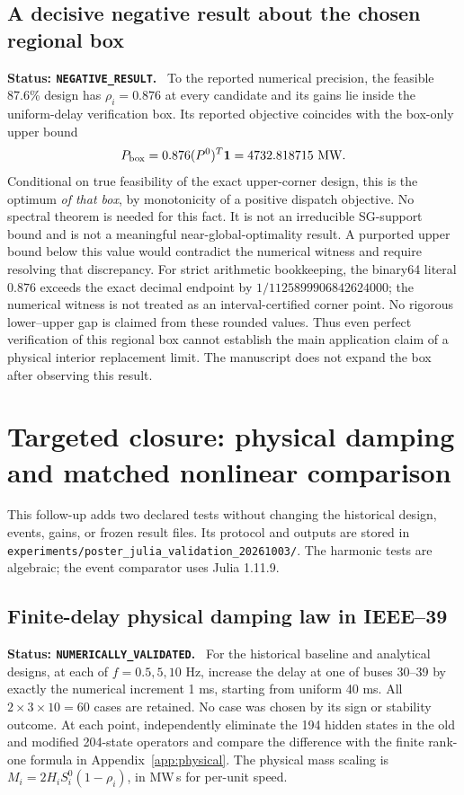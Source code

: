 \documentclass[11pt]{article}
\newcommand{\status}[1]{\par\smallskip\noindent\textbf{Status: \texttt{#1}.}\ }
\begin{document}
\subsection{A decisive negative result about the chosen regional box}
\status{NEGATIVE\_RESULT}
To the reported numerical precision, the feasible 87.6\% design has
$\rho_i=0.876$ at every candidate and its gains lie inside the
uniform-delay verification box. Its reported objective coincides with
the box-only upper bound
\[
 P_{\rm box}=0.876(P^0)^T\mathbf1=4732.818715\ {\rm MW}.
\]
Conditional on true feasibility of the exact upper-corner design,
this is the optimum \emph{of that box}, by monotonicity of a positive
dispatch objective. No spectral theorem is needed for this fact.
It is not an irreducible SG-support bound and is not a meaningful
near-global-optimality result. A purported upper bound below this
value would contradict the numerical witness and require resolving
that discrepancy. For strict arithmetic bookkeeping, the binary64
literal $0.876$ exceeds the exact decimal endpoint by
$1/1125899906842624000$; the numerical witness is not treated as
an interval-certified corner point. No rigorous lower--upper gap
is claimed from these rounded values.
Thus even perfect verification of this regional box cannot establish
the main application claim of a physical interior replacement limit.
The manuscript does not expand the box after observing this result.





\section{Targeted closure: physical damping and matched nonlinear comparison}
\label{sec:posterclosure}
This follow-up adds two declared tests without changing the historical
design, events, gains, or frozen result files. Its protocol and outputs
are stored in \texttt{experiments/poster\_julia\_validation\_20261003/}.
The harmonic tests are algebraic; the event comparator uses Julia 1.11.9.

\subsection{Finite-delay physical damping law in IEEE--39}
\status{NUMERICALLY\_VALIDATED}
For the historical baseline and analytical designs, at each of
$f=0.5,5,10$ Hz, increase the delay at one of buses 30--39 by exactly
the numerical increment 1 ms, starting from uniform 40 ms.
All $2\times3\times10=60$ cases are retained. No case was chosen by
its sign or stability outcome. At each point, independently eliminate
the 194 hidden states in the old and modified 204-state operators and
compare the difference with the finite rank-one formula
in Appendix~\ref{app:physical}.
The physical mass scaling is
$M_i=2H_iS_i^0(1-\rho_i)$, in MW\,s for per-unit speed.
\end{document}
